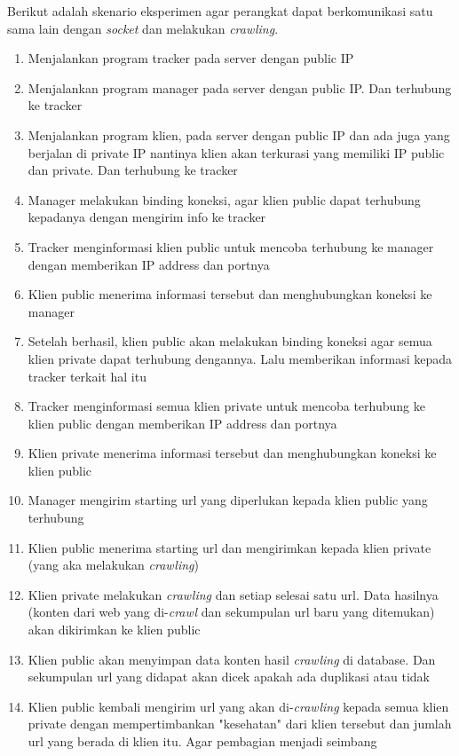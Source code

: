 Berikut adalah skenario eksperimen agar perangkat dapat berkomunikasi satu sama lain dengan \emph{socket} dan melakukan \emph{crawling}.

\begin{enumerate}
  \item{Menjalankan program tracker pada server dengan public IP}
  \item{Menjalankan program manager pada server dengan public IP. Dan terhubung ke tracker}
  \item{Menjalankan program klien, pada server dengan public IP dan ada juga yang berjalan di private IP nantinya klien akan terkurasi yang memiliki IP public dan private. Dan terhubung ke tracker}
  \item{Manager melakukan binding koneksi, agar klien public dapat terhubung kepadanya dengan mengirim info ke tracker}
  \item{Tracker menginformasi klien public untuk mencoba terhubung ke manager dengan memberikan IP address dan portnya}
  \item{Klien public menerima informasi tersebut dan menghubungkan koneksi ke manager}
  \item{Setelah berhasil, klien public akan melakukan binding koneksi agar semua klien private dapat terhubung dengannya. Lalu memberikan informasi kepada tracker terkait hal itu}
  \item{Tracker menginformasi semua klien private untuk mencoba terhubung ke klien public dengan memberikan IP address dan portnya}
  \item{Klien private menerima informasi tersebut dan menghubungkan koneksi ke klien public}
  \item{Manager mengirim starting url yang diperlukan kepada klien public yang terhubung}
  \item{Klien public menerima starting url dan mengirimkan kepada klien private (yang aka melakukan \emph{crawling})}
  \item{Klien private melakukan \emph{crawling} dan setiap selesai satu url. Data hasilnya (konten dari web yang di-\emph{crawl} dan sekumpulan url baru yang ditemukan) akan dikirimkan ke klien public}
  \item{Klien public akan menyimpan data konten hasil \emph{crawling} di database. Dan sekumpulan url yang didapat akan dicek apakah ada duplikasi atau tidak}
  \item{Klien public kembali mengirim url yang akan di-\emph{crawling} kepada semua klien private dengan mempertimbankan "kesehatan" dari klien tersebut dan jumlah url yang berada di klien itu. Agar pembagian menjadi seimbang}
\end{enumerate}

